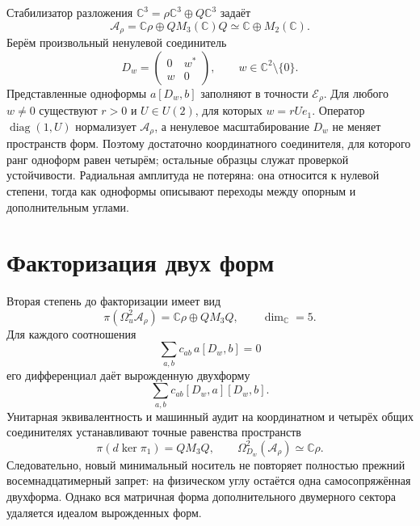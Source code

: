 Стабилизатор разложения \(\mathbb C^3=\rho\mathbb C^3\oplus Q\mathbb C^3\)
задаёт
\begin{equation}
 \mathcal A_\rho=\mathbb C\rho\oplus QM_3(\mathbb C)Q
 \simeq\mathbb C\oplus M_2(\mathbb C).
 \label{eq:v5-rank-one-zero-algebra}
\end{equation}
Берём произвольный ненулевой соединитель
\begin{equation}
 D_w=\begin{pmatrix}0&w^*\\w&0\end{pmatrix},
 \qquad w\in\mathbb C^2\setminus\{0\}.
\end{equation}
Представленные одноформы \(a[D_w,b]\) заполняют в точности
\(\mathcal E_\rho\). Для любого \(w\ne0\) существуют \(r>0\) и
\(U\in U(2)\), для которых \(w=rUe_1\). Оператор
\(\operatorname{diag}(1,U)\) нормализует \(\mathcal A_\rho\), а ненулевое
масштабирование \(D_w\) не меняет пространств форм. Поэтому достаточно
координатного соединителя, для которого ранг одноформ равен четырём;
остальные образцы служат проверкой устойчивости. Радиальная амплитуда не
потеряна: она относится к нулевой степени, тогда как одноформы описывают
переходы между опорным и дополнительным углами.

\section{Факторизация двух форм}

Вторая степень до факторизации имеет вид
\begin{equation}
 \pi(\Omega_u^2\mathcal A_\rho)
 =\mathbb C\rho\oplus QM_3Q,
 \qquad \dim_{\mathbb C}=5.
\end{equation}
Для каждого соотношения
\begin{equation}
 \sum_{a,b}c_{ab}\,a[D_w,b]=0
\end{equation}
его дифференциал даёт вырожденную двухформу
\begin{equation}
 \sum_{a,b}c_{ab}[D_w,a][D_w,b].
\end{equation}
Унитарная эквивалентность и машинный аудит на координатном и четырёх общих
соединителях устанавливают точные равенства пространств
\begin{equation}
 \pi(d\ker\pi_1)=QM_3Q,
 \qquad
 \Omega_{D_w}^2(\mathcal A_\rho)
 \simeq\mathbb C\rho.
 \label{eq:v5-rank-one-twoform-quotient}
\end{equation}
Следовательно, новый минимальный носитель не повторяет полностью прежний
восемнадцатимерный запрет: на физическом углу остаётся одна самосопряжённая
двухформа. Однако вся матричная форма дополнительного двумерного сектора
удаляется идеалом вырожденных форм.

